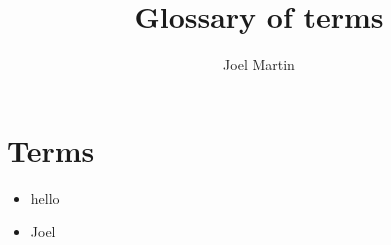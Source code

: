 \documentclass[]{article}
\title{Glossary of terms}
\author{Joel Martin}
\begin{document}
\maketitle

\begin{abstract}

\end{abstract}

\section{Terms}

\begin{itemize}
	\item hello
	\item Joel
\end{itemize}
\end{document}
